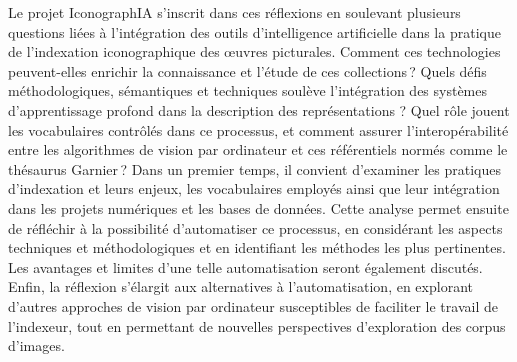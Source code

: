 Le projet IconographIA s'inscrit dans ces réflexions en soulevant plusieurs questions liées à l’intégration des outils d’intelligence artificielle dans la pratique de l’indexation iconographique des œuvres picturales. Comment ces technologies peuvent-elles enrichir la connaissance et l’étude de ces collections ? Quels défis méthodologiques, sémantiques et techniques soulève l’intégration des systèmes d'apprentissage profond dans la description des représentations ? Quel rôle jouent les vocabulaires contrôlés dans ce processus, et comment assurer l’interopérabilité entre les algorithmes de vision par ordinateur et ces référentiels normés comme le thésaurus Garnier ?
Dans un premier temps, il convient d'examiner les pratiques d’indexation et leurs enjeux, les vocabulaires employés ainsi que leur intégration dans les projets numériques et les bases de données. Cette analyse permet ensuite de réfléchir à la possibilité d’automatiser ce processus, en considérant les aspects techniques et méthodologiques et en identifiant les méthodes les plus pertinentes. Les avantages et limites d’une telle automatisation seront également discutés. Enfin, la réflexion s’élargit aux alternatives à l’automatisation, en explorant d’autres approches de vision par ordinateur susceptibles de faciliter le travail de l’indexeur, tout en permettant de nouvelles perspectives d’exploration des corpus d’images.
